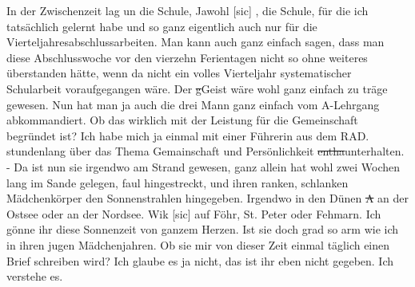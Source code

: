 \def\day{24. August 1943}
\mktitle

In der Zwischenzeit lag un die Schule, Jawohl{\color{red} [sic] }, die Schule, f\"{u}r die ich tats\"{a}chlich gelernt habe und so ganz eigentlich auch nur f\"{u}r die Vierteljahresabschlussarbeiten.
Man kann auch ganz einfach sagen, dass man diese Abschlusswoche vor den vierzehn Ferientagen nicht so ohne weiteres \"{u}berstanden h\"{a}tte, wenn da nicht ein volles Vierteljahr systematischer Schularbeit voraufgegangen w\"{a}re.
Der \st{g}Geist w\"{a}re wohl ganz einfach zu tr\"{a}ge gewesen.
Nun hat man ja auch die drei Mann ganz einfach vom A-Lehrgang abkommandiert.
Ob das wirklich mit der Leistung f\"{u}r die Gemeinschaft begr\"{u}ndet ist?
Ich habe mich ja einmal mit einer F\"{u}hrerin aus dem RAD. stundenlang \"{u}ber das Thema Gemainschaft und Pers\"{o}nlichkeit \st{entha}unterhalten.
- Da ist nun sie irgendwo am Strand gewesen, ganz allein hat wohl zwei Wochen lang im Sande gelegen, faul hingestreckt, und ihren ranken, schlanken M\"{a}dchenk\"{o}rper den Sonnenstrahlen hingegeben.
Irgendwo in den D\"{u}nen \st{A} an der Ostsee oder an der Nordsee.
Wik{\color{red} [sic] } auf F\"{o}hr, St. Peter oder Fehmarn.
Ich g\"{o}nne ihr diese Sonnenzeit von ganzem Herzen.
Ist sie doch grad so arm wie ich in ihren jugen M\"{a}dchenjahren.
Ob sie mir von dieser Zeit einmal t\"{a}glich einen Brief schreiben wird?
Ich glaube es ja nicht, das ist ihr eben nicht gegeben.
Ich verstehe es.

\clearpage
